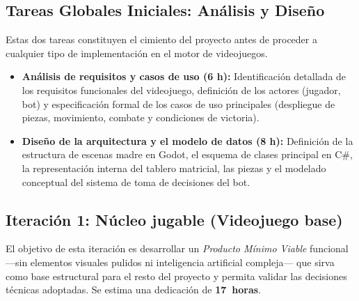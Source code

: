 \subsection{Tareas Globales Iniciales: Análisis y Diseño}

Estas dos tareas constituyen el cimiento del proyecto antes de proceder a cualquier tipo de implementación en el motor de videojuegos.

\begin{itemize}
	\item \textbf{Análisis de requisitos y casos de uso (6 h):} Identificación detallada de los requisitos funcionales del videojuego, definición de los actores (jugador, bot) y especificación formal de los casos de uso principales (despliegue de piezas, movimiento, combate y condiciones de victoria).
	\item \textbf{Diseño de la arquitectura y el modelo de datos (8 h):} Definición de la estructura de escenas madre en Godot, el esquema de clases principal en C\#, la representación interna del tablero matricial, las piezas y el modelado conceptual del sistema de toma de decisiones del bot.
\end{itemize}

\subsection{Iteración 1: Núcleo jugable (Videojuego base)}

El objetivo de esta iteración es desarrollar un \textit{Producto Mínimo Viable} funcional ---sin elementos visuales pulidos ni inteligencia artificial compleja--- que sirva como base estructural para el resto del proyecto y permita validar las decisiones técnicas adoptadas. Se estima una dedicación de \textbf{17~horas}.

